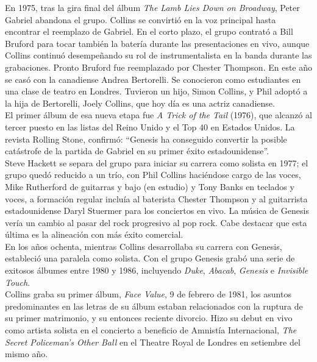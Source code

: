 \documentclass[11pt, oneside]{book}
\begin{document}
  En 1975, tras la gira final del álbum \emph{The Lamb Lies Down on Broadway}, Peter Gabriel abandona el grupo. Collins se convirtió en la voz principal hasta encontrar el reemplazo de Gabriel. En el corto plazo, el grupo contrató a Bill Bruford para tocar también la batería durante las presentaciones en vivo, aunque Collins continuó desempeñando su rol de instrumentalista en la banda durante las grabaciones. Pronto Bruford fue reemplazado por Chester Thompson. En este año se casó con la canadiense Andrea Bertorelli. Se conocieron como estudiantes en una clase de teatro en Londres. Tuvieron un hijo, Simon Collins, y Phil adoptó a la hija de Bertorelli, Joely Collins, que hoy día es una actriz canadiense.\\

  El primer álbum de esa nueva etapa fue \emph{A Trick of the Tail} (1976), que alcanzó al tercer puesto en las listas del Reino Unido y el Top 40 en Estados Unidos. La revista Rolling Stone, confirmó: ``Genesis ha conseguido convertir la posible catástrofe de la partida de Gabriel en su primer éxito estadounidense''.\\

  Steve Hackett se separa del grupo para iniciar su carrera como solista en 1977; el grupo quedó reducido a un trío, con Phil Collins haciéndose cargo de las voces, Mike Rutherford de guitarras y bajo (en estudio) y Tony Banks en teclados y voces, a formación regular incluía al baterista Chester Thompson y al guitarrista estadounidense Daryl Stuermer para los conciertos en vivo. La música de Genesis vería un cambio al pasar del rock progresivo al pop rock. Cabe destacar que esta última es la alineación con más éxito comercial.\\

  En los años ochenta, mientras Collins desarrollaba su carrera con Genesis, estableció una paralela como solista. Con el grupo Genesis grabó una serie de exitosos álbumes entre 1980 y 1986, incluyendo \emph{Duke}, \emph{Abacab}, \emph{Genesis} e \emph{Invisible Touch}.\\

  Collins graba su primer álbum, \emph{Face Value}, 9 de febrero de 1981, los asuntos predominantes en las letras de su álbum estaban relacionados con la ruptura de su primer matrimonio, y su entonces reciente divorcio. Hizo su debut en vivo como artista solista en el concierto a beneficio de Amnistía Internacional, \emph{The Secret Policeman's Other Ball} en el Theatre Royal de Londres en setiembre del mismo año.\\
\end{document}
